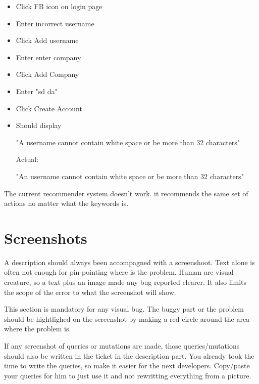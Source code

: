 \documentclass[a4paper,article,oneside]{memoir}
\begin{document}
\noindent{}

\begin{itemize}
  \item Click FB icon on login page
  \item Enter incorrect username
  \item Click Add username
  \item Enter enter company
  \item Click Add Company
  \item Enter "sd da"
  \item Click Create Account
  \item {Should display

"A username cannot contain white space or be more than 32 characters"

Actual:

"An username cannot contain white space or be more than 32 characters"}
\end{itemize}

\noindent{}

The current recommender system doesn't work. it recommends the same set of actions no matter what the keywords is.

        \section{Screenshots}
        A description should always been accompagned with a screenshoot. Text alone is often not enough for pin-pointing where is the problem. Human are visual creature, so a text plus an image made any bug reported clearer. It also limits the scope of the error to what the screenshot will show.
        
        This section is mandatory for any visual bug. The buggy part or the problem should be hightlighed on the screenshot by making a red circle around the area where the problem is.

If any screenshot of queries or mutations are made, those queries/mutations should also be written in the ticket in the description part. You already took the time to write the queries, so make it easier for the next developers. Copy/paste your queries for him to just use it and not rewritting everything from a picture.
        
\noindent{}
\end{document}
